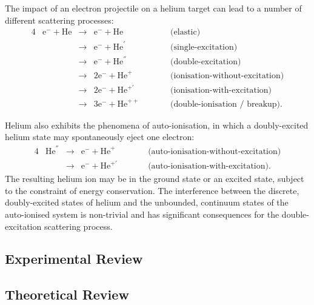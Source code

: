 \documentclass[]{article}
\begin{document}
The impact of an electron projectile on a helium target can lead to a number of
different scattering processes:
\begin{alignat*}{4}
  &
  \mathrm{e}^{-}
  +
  \mathrm{He}
  &
  {}\to{}
  &
  \mathrm{e}^{-}
  +
  \mathrm{He}
  &
  \quad\quad
  &
  \text{(elastic)}
  \\
  &
  &
  {}\to{}
  &
  \mathrm{e}^{-}
  +
  \mathrm{He}^{'}
  &
  &
  \text{(single-excitation)}
  \\
  &
  &
  {}\to{}
  &
  \mathrm{e}^{-}
  +
  \mathrm{He}^{''}
  &
  &
  \text{(double-excitation)}
  \\
  &
  &
  {}\to{}
  &
  2
  \mathrm{e}^{-}
  +
  \mathrm{He}^{+}
  &
  &
  \text{(ionisation-without-excitation)}
  \\
  &
  &
  {}\to{}
  &
  2
  \mathrm{e}^{-}
  +
  \mathrm{He}^{+'}
  &
  &
  \text{(ionisation-with-excitation)}
  \\
  &
  &
  {}\to{}
  &
  3
  \mathrm{e}^{-}
  +
  \mathrm{He}^{++}
  &
  &
  \text{(double-ionisation / breakup)}
  .
\end{alignat*}


Helium also exhibits the phenomena of auto-ionisation, in which a doubly-excited
helium state may spontaneously eject one electron:
\begin{alignat*}{4}
  &
  \mathrm{He}^{''}
  &
  {}\to{}
  &
  \mathrm{e}^{-}
  +
  \mathrm{He}^{+}
  &
  \quad\quad
  &
  \text{(auto-ionisation-without-excitation)}
  \\
  &
  &
  {}\to{}
  &
  \mathrm{e}^{-}
  +
  \mathrm{He}^{+'}
  &
  \quad\quad
  &
  \text{(auto-ionisation-with-excitation)}
  .
\end{alignat*}
The resulting helium ion may be in the ground state or an excited state,
subject to the constraint of energy conservation.
The interference between the discrete, doubly-excited states of helium and the
unbounded, continuum states of the auto-ionised system is non-trivial and has
significant consequences for the double-excitation scattering process.


\subsection{Experimental Review}
\label{sec:in-exp}

\subsection{Theoretical Review}
\label{sec:in-th}
\end{document}
